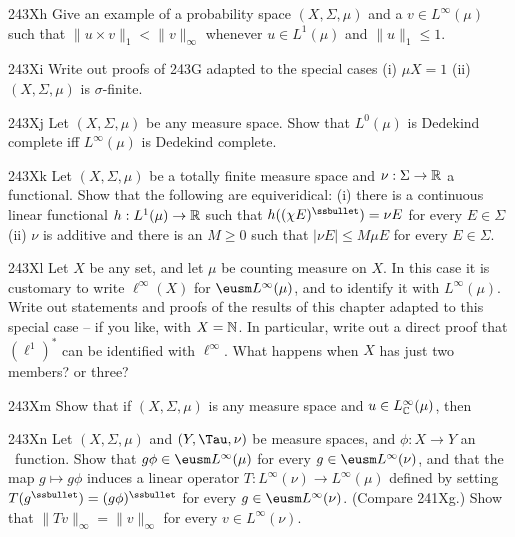 {

\spheader 243Xh Give an example of a probability space
$(X,\Sigma,\mu)$ and a $v\in L^{\infty}(\mu)$ such that
$\|u\times v\|_1<\|v\|_{\infty}$ whenever $u\in L^1(\mu)$ and
$\|u\|_1\le 1$.
     
\spheader 243Xi Write out proofs of 243G adapted to the special
cases (i) $\mu X=1$ (ii) $(X,\Sigma,\mu)$ is $\sigma$-finite.
     
\spheader 243Xj Let $(X,\Sigma,\mu)$ be any measure space.
Show that $L^0(\mu)$ is Dedekind complete iff $L^{\infty}(\mu)$ is
Dedekind complete.
     
\spheader 243Xk Let $(X,\Sigma,\mu)$ be a totally finite measure
space and $\nu:\Sigma\to\Bbb R$ a functional.   Show that the following
are equiveridical:   (i) there is a continuous linear functional
$h:L^1(\mu)\to\Bbb R$ such that $h((\chi E)^{\ssbullet})=\nu E$ for
every $E\in\Sigma$ (ii) $\nu$ is additive and there is an $M\ge 0$ such
that $|\nu E|\le M\mu E$ for every $E\in\Sigma$.
     
\sqheader 243Xl  Let $X$ be any set, and let $\mu$ be counting
measure on $X$.
In this case it is customary  to write $\ell^{\infty}(X)$ for $\eusm
L^{\infty}(\mu)$, and to identify it with
$L^{\infty}(\mu)$.   Write out statements
and proofs of the results of this chapter adapted to this special
case -- if you like, with $X=\Bbb N$.   In particular, write out a
direct proof that $(\ell^1)^*$ can be identified with $\ell^{\infty}$.
What happens when $X$ has just two members? or three?
     
\spheader 243Xm Show that if $(X,\Sigma,\mu)$ is any measure
space and $u\in L^{\infty}_{\Bbb C}(\mu)$, then
     
     
\spheader 243Xn Let $(X,\Sigma,\mu)$ and $(Y,\Tau,\nu)$ be measure
spaces, and $\phi:X\to Y$ an \imp\ function.   Show that 
$g\phi\in\eusm L^{\infty}(\mu)$ for every $g\in\eusm L^{\infty}(\nu)$, and that the map $g\mapsto g\phi$ induces a linear operator $T:L^{\infty}(\nu)\to L^{\infty}(\mu)$ defined by setting
$T(g^{\ssbullet})=(g\phi)^{\ssbullet}$ for every 
$g\in\eusm L^{\infty}(\nu)$.   (Compare 241Xg.)   Show that
$\|Tv\|_{\infty}=\|v\|_{\infty}$ for every $v\in L^{\infty}(\nu)$.
     
}
